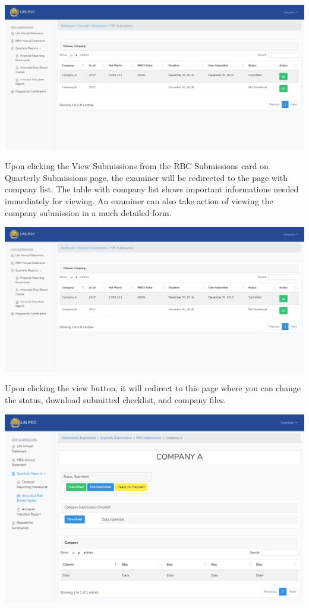 \documentclass{article}
\begin{document}
\includegraphics[keepaspectratio=true]{up-ic-screens/image97}{}%

\mdhr{}%

\noindent{}Upon clicking the View Submissions from the RBC
Submissions card on Quarterly Submissions page, the examiner will be
redirected to the page with company list. The table with company list
shows important informations needed immediately for viewing. An examiner
can also take action of viewing the company submission in a much
detailed form.%

\includegraphics[keepaspectratio=true]{up-ic-screens/image106}{}%

Upon clicking the view button, it will redirect to this
page where you can change the status, download submitted checklist, and
company files.%

\includegraphics[keepaspectratio=true]{up-ic-screens/image198}{}%
\end{document}
